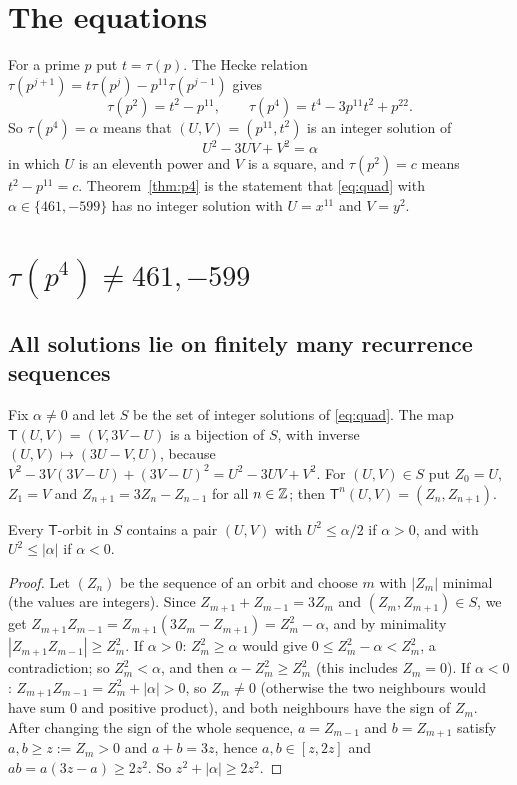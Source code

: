 \section{The equations}\label{sec:equations}

For a prime $p$ put $t=\tau(p)$. The Hecke relation $\tau(p^{j+1})=t\tau(p^j)-p^{11}\tau(p^{j-1})$ gives
\[
\tau(p^2)=t^2-p^{11},\qquad\tau(p^4)=t^4-3p^{11}t^2+p^{22}.
\]
So $\tau(p^4)=\alpha$ means that $(U,V)=(p^{11},t^2)$ is an integer solution of
\begin{equation}\label{eq:quad}
U^2-3UV+V^2=\alpha
\end{equation}
in which $U$ is an eleventh power and $V$ is a square, and $\tau(p^2)=c$ means $t^2-p^{11}=c$. Theorem~\ref{thm:p4} is the statement that \eqref{eq:quad} with $\alpha\in\{461,-599\}$ has no integer solution with $U=x^{11}$ and $V=y^2$.

\section{\texorpdfstring{$\tau(p^4)\ne461,-599$}{tau(p\^{}4) is not 461, -599}}\label{sec:p4}

\subsection{All solutions lie on finitely many recurrence sequences}
Fix $\alpha\ne0$ and let $S$ be the set of integer solutions of \eqref{eq:quad}. The map $\mathsf T(U,V)=(V,3V-U)$ is a bijection of $S$, with inverse $(U,V)\mapsto(3U-V,U)$, because $V^2-3V(3V-U)+(3V-U)^2=U^2-3UV+V^2$. For $(U,V)\in S$ put $Z_0=U$, $Z_1=V$ and $Z_{n+1}=3Z_n-Z_{n-1}$ for all $n\in\mathbb Z$; then $\mathsf T^n(U,V)=(Z_n,Z_{n+1})$.

\begin{lemma}\label{lem:seed}
Every $\mathsf T$-orbit in $S$ contains a pair $(U,V)$ with $U^2\le\alpha/2$ if $\alpha>0$, and with $U^2\le|\alpha|$ if $\alpha<0$.
\end{lemma}

\begin{proof}
Let $(Z_n)$ be the sequence of an orbit and choose $m$ with $|Z_m|$ minimal (the values are integers). Since $Z_{m+1}+Z_{m-1}=3Z_m$ and $(Z_m,Z_{m+1})\in S$, we get $Z_{m+1}Z_{m-1}=Z_{m+1}(3Z_m-Z_{m+1})=Z_m^2-\alpha$, and by minimality $|Z_{m+1}Z_{m-1}|\ge Z_m^2$. If $\alpha>0$: $Z_m^2\ge\alpha$ would give $0\le Z_m^2-\alpha<Z_m^2$, a contradiction; so $Z_m^2<\alpha$, and then $\alpha-Z_m^2\ge Z_m^2$ (this includes $Z_m=0$). If $\alpha<0$: $Z_{m+1}Z_{m-1}=Z_m^2+|\alpha|>0$, so $Z_m\ne0$ (otherwise the two neighbours would have sum $0$ and positive product), and both neighbours have the sign of $Z_m$. After changing the sign of the whole sequence, $a=Z_{m-1}$ and $b=Z_{m+1}$ satisfy $a,b\ge z:=Z_m>0$ and $a+b=3z$, hence $a,b\in[z,2z]$ and $ab=a(3z-a)\ge2z^2$. So $z^2+|\alpha|\ge2z^2$.
\end{proof}

